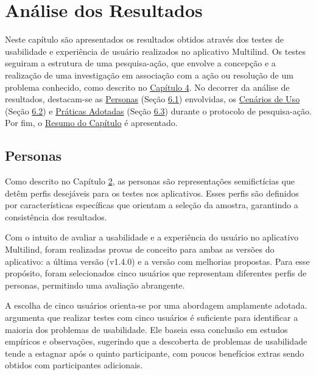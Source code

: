 \chapter[Análise dos Resultados]{Análise dos Resultados}
\label{chap:Análise dos Resultados}
Neste capítulo são apresentados os resultados obtidos através dos testes de usabilidade e experiência de usuário realizados no aplicativo Multilind. Os testes seguiram a estrutura de uma pesquisa-ação, que envolve a concepção e a realização de uma 
investigação em associação com a ação ou resolução de um problema conhecido, como descrito no \hyperref[sec:Metodologia de Analise de Resultados]{Capítulo 4}. No decorrer da análise de resultados, destacam-se as \hyperref[sec:Personas]{Personas} 
(Seção \hyperref[sec:Personas]{6.1}) envolvidas, os \hyperref[sec:Cenários de Uso]{Cenários de Uso} (Seção \hyperref[sec:Cenários de Uso]{6.2}) e \hyperref[sec:Práticas Adotadas]{Práticas Adotadas} (Seção \hyperref[sec:Práticas Adotadas]{6.3}) 
durante o protocolo de pesquisa-ação. Por fim, o \hyperref[sec:Resumo do Capítulo 3]{Resumo do Capítulo} é apresentado.

\section{Personas}
\label{sec:Personas}
Como descrito no Capítulo \hyperref[sec:Persona]{2}, as personas são representações semifictícias que detêm perfis desejáveis para os testes nos aplicativos. Esses perfis são definidos por características específicas que orientam a seleção da amostra, 
garantindo a consistência dos resultados. 

Com o intuito de avaliar a usabilidade e a experiência do usuário no aplicativo Multilind, foram realizadas provas de conceito para ambas as versões do aplicativo: a última versão (v1.4.0) e a versão com melhorias propostas. Para esse propósito, 
foram selecionados cinco usuários que representam diferentes perfis de personas, permitindo uma avaliação abrangente.

A escolha de cinco usuários orienta-se por uma abordagem amplamente adotada.  argumenta que realizar testes com cinco usuários é suficiente para identificar a maioria dos problemas de 
usabilidade. Ele baseia essa conclusão em estudos empíricos e observações, sugerindo que a descoberta de problemas de usabilidade tende a estagnar após o quinto participante, com poucos benefícios 
extras sendo obtidos com participantes adicionais.

